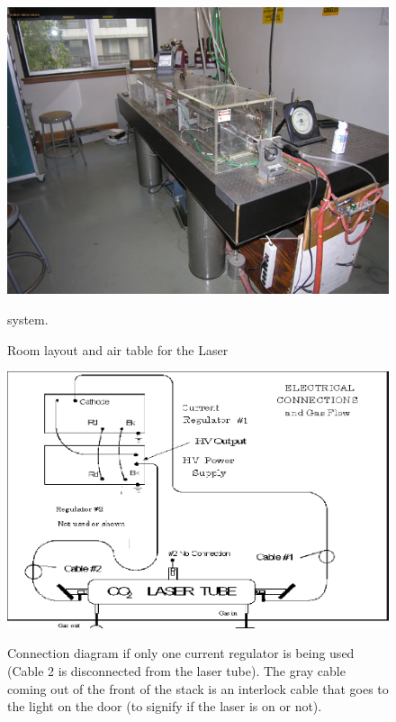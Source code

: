 \documentclass{../lab}
\begin{document}
\begin{figure}[H]
\centering
    \href{http://experimentationlab.berkeley.edu/sites/default/files/images/Co2_3.jpg}{\includegraphics[width=0.8\linewidth]{images/Co2_3.jpg}} \\
    \caption{Room layout and air table for the Laser} system.
\end{figure}

\begin{figure}[H]
\centering
    \href{http://experimentationlab.berkeley.edu/sites/default/files/images/Co2-29-new.png}{\includegraphics[width=0.6\linewidth]{images/Co2-29-new.png}} \\
    \caption{Connection diagram if only one current regulator is being used (Cable 2 is disconnected from the laser tube). The gray cable coming out of the front of the stack is an interlock cable that goes to the light on the door (to signify if the laser is on or not).}
\end{figure}
\end{document}
